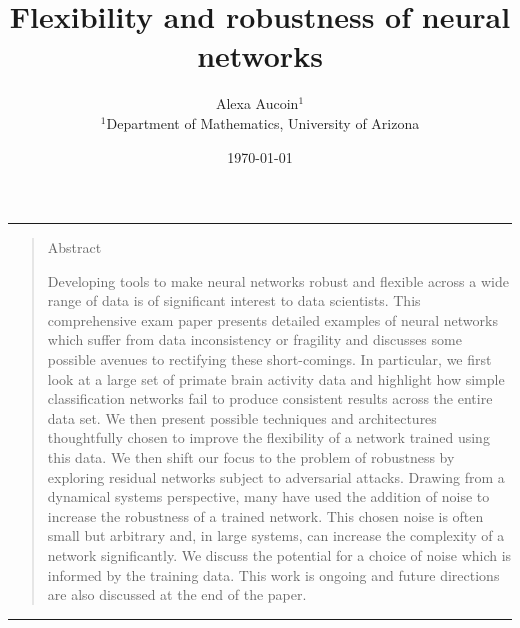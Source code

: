 \documentclass[12pt]{article}
\title{Flexibility and robustness of neural networks}
\author{Alexa Aucoin$^{1}$ \\ \normalsize{$^{1}$Department of Mathematics, University of Arizona}}
\date{\today}
\newenvironment{sciabstract}{%
\begin{quote} \bf}
{\end{quote}}
\begin{document}
\maketitle

\hrule
\begin{sciabstract}
\begin{center} \large{Abstract}\end{center}
Developing tools to make neural networks robust and flexible across a wide range of data is of significant interest to data scientists. This comprehensive exam paper presents detailed examples of neural networks which suffer from data inconsistency or fragility and discusses some possible avenues to rectifying these short-comings. In particular, we first look at a large set of primate brain activity data and highlight how simple classification networks fail to produce consistent results across the entire data set. We then present possible techniques and architectures thoughtfully chosen to improve the flexibility of a network trained using this data. We then shift our focus to the problem of robustness by exploring residual networks subject to adversarial attacks. Drawing from a dynamical systems perspective, many have used the addition of noise to increase the robustness of a trained network. This chosen noise is often small but arbitrary and, in large systems, can increase the complexity of a network significantly. We discuss the potential for a choice of noise which is informed by the training data. This work is ongoing and future directions are also discussed at the end of the paper.
\end{sciabstract}
\hrule
\end{document}
